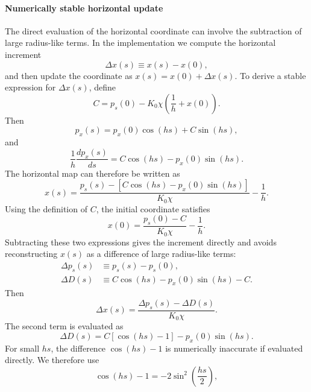 \paragraph{Numerically stable horizontal update}

The direct evaluation of the horizontal coordinate can involve the subtraction
of large radius-like terms. In the implementation we compute the horizontal
increment
\begin{equation}
\Delta x(s) \equiv x(s)-x(0),
\end{equation}
and then update the coordinate as \(x(s)=x(0)+\Delta x(s)\). To derive a
stable expression for \(\Delta x(s)\), define
\begin{equation}
C = p_s(0)-K_0\chi\left(\frac{1}{h}+x(0)\right).
\end{equation}
Then
\begin{equation}
p_x(s)=p_x(0)\cos(hs)+C\sin(hs),
\end{equation}
and
\begin{equation}
\frac{1}{h}\frac{dp_x(s)}{ds}
=
C\cos(hs)-p_x(0)\sin(hs).
\end{equation}
The horizontal map can therefore be written as
\begin{equation}
x(s)=
\frac{p_s(s)-\left[C\cos(hs)-p_x(0)\sin(hs)\right]}{K_0\chi}
-\frac{1}{h}.
\end{equation}
Using the definition of \(C\), the initial coordinate satisfies
\begin{equation}
x(0)=
\frac{p_s(0)-C}{K_0\chi}
-\frac{1}{h}.
\end{equation}
Subtracting these two expressions gives the increment directly and avoids
reconstructing \(x(s)\) as a difference of large radius-like terms:
\begin{align}
\Delta p_s(s) &\equiv p_s(s)-p_s(0), \\
\Delta D(s) &\equiv C\cos(hs)-p_x(0)\sin(hs)-C.
\end{align}
Then
\begin{equation}
\Delta x(s)
=
\frac{\Delta p_s(s)-\Delta D(s)}{K_0\chi}.
\end{equation}
The second term is evaluated as
\begin{equation}
\Delta D(s)
=
C\left[\cos(hs)-1\right]-p_x(0)\sin(hs).
\end{equation}
For small \(hs\), the difference \(\cos(hs)-1\) is numerically inaccurate if
evaluated directly. We therefore use
\begin{equation}
\cos(hs)-1
=
-2\sin^2\left(\frac{hs}{2}\right),
\end{equation}
